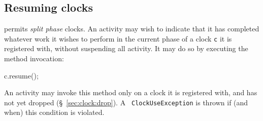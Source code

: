 \subsection{Resuming clocks}\label{resume}\label{sec:clock:resume}
\Xten{} permits {\em split phase} clocks. An activity may wish
to indicate that it has completed whatever work it wishes to perform
in the current phase of a  clock {\tt c} it is registered with, without
suspending all activity. It may do so  by executing the method
invocation:
\begin{x10}
  c.resume();
\end{x10}

An activity may invoke this method only on a clock it is registered 
with, and has not yet dropped (\S~\ref{sec:clock:drop}). A {\tt
ClockUseException} is thrown if (and when) 
this condition is violated.
